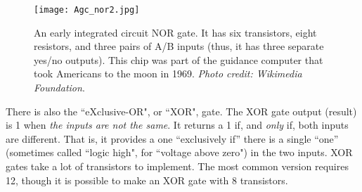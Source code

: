 \begin{figure}[h!]
\begin{center}
\texttt{[image: Agc\_nor2.jpg]}
\caption{An early integrated circuit NOR gate. It has six transistors, eight resistors, and three pairs of A/B inputs (thus, it has three separate yes/no outputs). This chip was part of the guidance computer that took Americans to the moon in 1969. \emph{Photo credit: Wikimedia Foundation}.}
\end{center}
\end{figure}


\clearpage
\newpage

There is also the ``eXclusive-OR", or ``XOR", gate. The XOR gate output (result) is 1 when \emph{the inputs are not the same}. It returns a 1 if, and \emph{only} if, both inputs are different. That is, it provides a one ``exclusively if'' there is a single ``one'' (sometimes called ``logic high", for ``voltage above zero") in the two inputs. XOR gates take a lot of transistors to implement. The most common version requires 12, though it is possible to make an XOR gate with 8 transistors.


